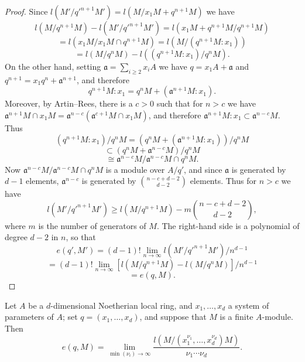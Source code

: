 \begin{proof}
Since $l(M'/q'^{n+1}M') = l(M/x_1M + q^{n+1}M)$ we have
\[
  l(M/q^{n+1}M) - l(M'/q'^{n+1}M') = l(x_1M + q^{n+1}M/q^{n+1}M)
\]
\[
  = l(x_1M/x_1M \cap q^{n+1}M) = l(M/(q^{n+1}M:x_1))
\]
\[
  = l(M/q^nM) - l((q^{n+1}M:x_1)/q^nM).
\]
On the other hand, setting $\mathfrak{a} = \sum_{i \ge 2} x_iA$ we have $q = x_1A + \mathfrak{a}$ and $q^{n+1} =
x_1q^n + \mathfrak{a}^{n+1}$, and therefore
\[
  q^{n+1}M:x_1 = q^nM + (\mathfrak{a}^{n+1}M:x_1).
\]
Moreover, by Artin--Rees, there is a $c > 0$ such that for $n > c$ we have
$\mathfrak{a}^{n+1}M \cap x_1M = \mathfrak{a}^{n-c}(\mathfrak{a}^{c+1}M \cap x_1M)$, and therefore $\mathfrak{a}^{n+1}M:x_1 \subset \mathfrak{a}^{n-c}M$.
Thus
\[
  (q^{n+1}M:x_1)/q^nM = (q^nM + (\mathfrak{a}^{n+1}M:x_1))/q^nM
\]
\[
  \subset (q^nM + \mathfrak{a}^{n-c}M)/q^nM
\]
\[
  \cong \mathfrak{a}^{n-c}M/\mathfrak{a}^{n-c}M \cap q^nM.
\]
Now $\mathfrak{a}^{n-c}M/\mathfrak{a}^{n-c}M \cap q^nM$ is a module over $A/q'$, and since $\mathfrak{a}$ is generated
by $d - 1$ elements, $\mathfrak{a}^{n-c}$ is generated by $\binom{n-c+d-2}{d-2}$ elements. Thus
for $n > c$ we have
\[
  l(M'/q'^{n+1}M') \ge l(M/q^{n+1}M) - m\binom{n-c+d-2}{d-2},
\]
where $m$ is the number of generators of $M$. The right-hand side is a
polynomial of degree $d - 2$ in $n$, so that
\[
  e(q', M') = (d - 1)! \lim_{n \to \infty} l(M'/q'^{n+1}M')/n^{d-1}
\]
\[
  = (d - 1)! \lim_{n \to \infty} [l(M/q^{n+1}M) - l(M/q^nM)]/n^{d-1}
\]
\[
  = e(q, M).
\]
\end{proof}

\begin{theorem}\label{thm:14.12}
Let $A$ be a $d$-dimensional Noetherian
local ring, and $x_1, \ldots, x_d$ a system of parameters of $A$; set $q = (x_1, \ldots, x_d)$, and
suppose that $M$ is a finite $A$-module. Then
\[
  e(q, M) = \lim_{\min(\nu_i) \to \infty} \frac{l(M/(x_1^{\nu_1}, \ldots, x_d^{\nu_d})M)}{\nu_1 \cdots \nu_d}.
\]
\end{theorem}

